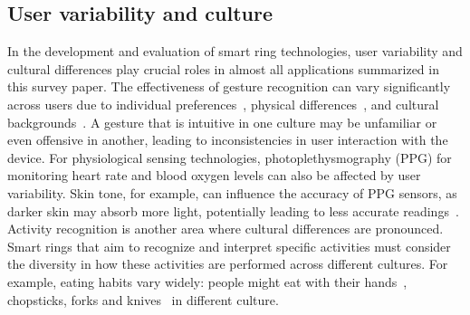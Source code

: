 


\subsection{User variability and culture}
In the development and evaluation of smart ring technologies, user variability and cultural differences play crucial roles in almost all applications summarized in this survey paper. The effectiveness of gesture recognition can vary significantly across users due to individual preferences~\cite{gheran2018gestures}, physical differences~\cite{altakrouri2016insights}, and cultural backgrounds~\cite{kwon2018cultural}. A gesture that is intuitive in one culture may be unfamiliar or even offensive in another, leading to inconsistencies in user interaction with the device. For physiological sensing technologies, photoplethysmography (PPG) for monitoring heart rate and blood oxygen levels can also be affected by user variability. Skin tone, for example, can influence the accuracy of PPG sensors, as darker skin may absorb more light, potentially leading to less accurate readings~\cite{scardulla2023photoplethysmograhic}. Activity recognition is another area where cultural differences are pronounced. Smart rings that aim to recognize and interpret specific activities must consider the diversity in how these activities are performed across different cultures. For example, eating habits vary widely: people might eat with their hands~\cite{moschetti2016recognition}, chopsticks, forks and knives~\cite{liu2017novel} in different culture.





